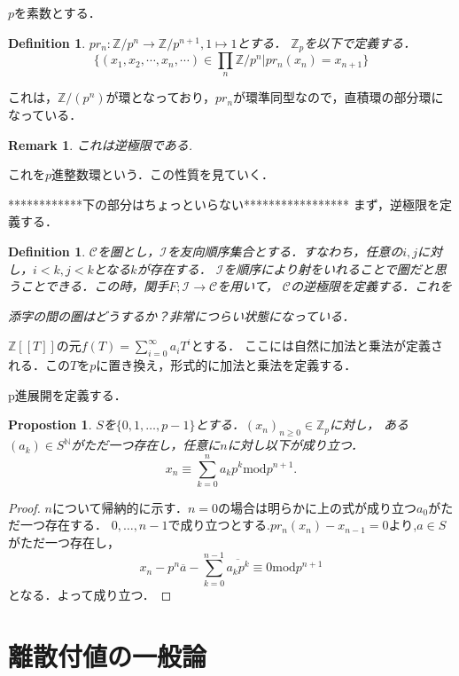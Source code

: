 \documentclass{ujarticle}
\newtheorem{dfn}[thm]{Definition}
\newtheorem{prop}[thm]{Propostion}
\newtheorem*{rem}{Remark}
\begin{document}
$p$を素数とする．
\begin{dfn}
$pr_n:\mathbb{Z}/p^n \to \mathbb{Z}/p^{n+1},1 \mapsto 1$とする．
$\mathbb{Z}_p$を以下で定義する．
\begin{equation*}
 \{ (x_1,x_2,\cdots,x_n,\cdots) \in \prod_{n} \mathbb{Z}/p^n | pr_n(x_n)=x_{n+1} \}
\end{equation*}
\end{dfn}
これは，$\mathbb{Z}/(p^n)$が環となっており，$pr_n$が環準同型なので，直積環の部分環になっている．
\begin{rem}
 これは逆極限である.
\end{rem}
これを$p$進整数環という．この性質を見ていく．


************下の部分はちょっといらない*****************
まず，逆極限を定義する．
\begin{dfn}
  $\mathcal{C}$を圏とし，$\mathcal{I}$を友向順序集合とする．すなわち，任意の$i,j$に対し，$i <k,j<k$となる$k$が存在する．
  $\mathcal{I}$を順序により射をいれることで圏だと思うことできる．この時，関手$F;\mathcal{I} \to \mathcal{C}$を用いて，
  $\mathcal{C}$の逆極限を定義する．これを

添字の間の圏はどうするか？非常につらい状態になっている．
\end{dfn}
$\mathbb{Z}[[T]]$の元$f(T)= \sum_{i=0}^{\infty}a_iT^i$とする．
ここには自然に加法と乗法が定義される．この$T$を$p$に置き換え，形式的に加法と乗法を定義する．

p進展開を定義する．
\begin{prop}
 $S$を$\{ 0,1, \dots,p-1\}$とする．$(x_n)_{n \ge 0} \in \mathbb{Z}_p$に対し，
 ある$(a_k) \in S^{\mathbb{N}}$がただ一つ存在し，任意に$n$に対し以下が成り立つ．
\begin{equation}
  x_n \equiv \sum_{k=0}^n a_kp^k \mathrm{mod} p^{n+1}.
\end{equation}
\end{prop}
\begin{proof}
 $n$について帰納的に示す．$n=0$の場合は明らかに上の式が成り立つ$a_0$がただ一つ存在する．
 $0,\dots,n-1$で成り立つとする.$pr_n(x_n) - x_{n-1}=0$より,$a \in S$がただ一つ存在し，
 \begin{equation*}
   x_n -p^n\overline{a} - \sum_{k=0}^{n-1} \overline{a_kp^k} \equiv 0 \mathrm{mod} p^{n+1}
 \end{equation*}
となる．よって成り立つ．
\end{proof}

\section{離散付値の一般論}
\label{sec:離散付値の一般論}
\end{document}
